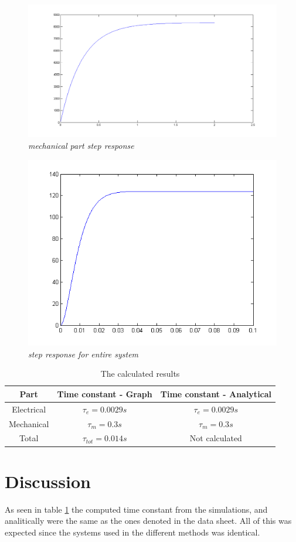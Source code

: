 \documentclass[12pt,a4paper]{article}
\begin{document}
\begin{figure}[h!]
  \centering
  \includegraphics[width=.4\linewidth]{mechanicalsim.png}

  \caption{\emph{mechanical part step response}}
  \label{fig:mechanical}
\end{figure}

\begin{figure}[h!]
  \centering
  \includegraphics[width=.4\linewidth]{fullsim.png}
  \caption{\emph{step response for entire system}}
  \label{fig:entire}
\end{figure}

\begin{table}[H]
\caption{\label{table:results}The calculated results}
\begin{center}
\begin{tabular}{ |c|c|c| } 
 \hline
 \textbf{Part} & \textbf{Time constant - Graph} & \textbf{Time constant - Analytical} \\
 \hline
 Electrical & $\tau_{e} = 0.0029 s$ & $\tau_{e} = 0.0029 s$ \\
 Mechanical & $\tau_{m} = 0.3 s$ & $\tau_{m} = 0.3 s$\\
 Total & $\tau_{tot} = 0.014 s$ & Not calculated\\ 
 \hline
\end{tabular}
\end{center}
\end{table}
\section{Discussion}
As seen in table \ref{table:results} the computed time constant from the simulations, and analitically were the same as the ones denoted in the data sheet. All of this was expected since the systems used in the different methods was identical.
\end{document}
